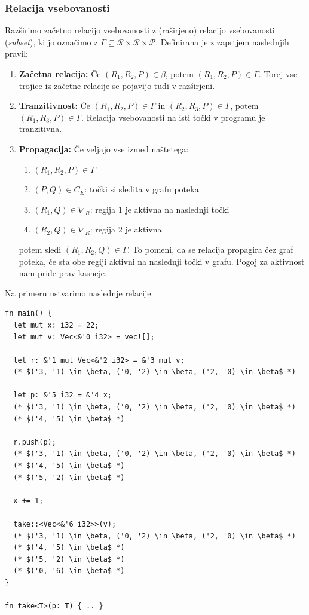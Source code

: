 \documentclass{article}
\begin{document}
\subsubsection{Relacija vsebovanosti}

Razširimo začetno relacijo vsebovanosti z (raširjeno) relacijo vsebovanosti (\textit{subset}), ki jo označimo z
$\Gamma \subseteq \mathcal{R} \times \mathcal{R} \times \mathcal{P}$. Definirana je z zaprtjem naslednjih pravil:

\begin{enumerate}
	\item \textbf{Začetna relacija: }Če $(R_1, R_2, P) \in \beta$, potem $(R_1, R_2, P) \in \Gamma$. Torej vse trojice
	      iz začetne relacije se pojavijo tudi v razširjeni.
	\item \textbf{Tranzitivnost:} Če $(R_1, R_2, P) \in \Gamma$ in $(R_2, R_3, P) \in \Gamma$, potem $(R_1, R_3, P) \in \Gamma$.
	      Relacija vsebovanosti na isti točki v programu je tranzitivna.
	\item \textbf{Propagacija:} Če veljajo vse izmed naštetega:
	      \begin{enumerate}
		      \item $(R_1, R_2, P) \in \Gamma$
		      \item $(P, Q) \in C_E$: točki si sledita v grafu poteka
		      \item $(R_1, Q) \in \nabla_R$: regija 1 je aktivna na naslednji točki
		      \item $(R_2, Q) \in \nabla_R$: regija 2 je aktivna
	      \end{enumerate}
	      potem sledi $(R_1, R_2, Q) \in \Gamma$. To pomeni, da se relacija propagira čez graf poteka, če sta obe
	      regiji aktivni na naslednji točki v grafu. Pogoj za aktivnost nam pride prav kasneje.
\end{enumerate}

Na primeru ustvarimo naslednje relacije:

\begin{lstlisting}
fn main() {
  let mut x: i32 = 22;
  let mut v: Vec<&'0 i32> = vec![];

  let r: &'1 mut Vec<&'2 i32> = &'3 mut v;
  (* $('3, '1) \in \beta, ('0, '2) \in \beta, ('2, '0) \in \beta$ *)

  let p: &'5 i32 = &'4 x;
  (* $('3, '1) \in \beta, ('0, '2) \in \beta, ('2, '0) \in \beta$ *)
  (* $('4, '5) \in \beta$ *)

  r.push(p);
  (* $('3, '1) \in \beta, ('0, '2) \in \beta, ('2, '0) \in \beta$ *)
  (* $('4, '5) \in \beta$ *)
  (* $('5, '2) \in \beta$ *)
  
  x += 1;

  take::<Vec<&'6 i32>>(v);
  (* $('3, '1) \in \beta, ('0, '2) \in \beta, ('2, '0) \in \beta$ *)
  (* $('4, '5) \in \beta$ *)
  (* $('5, '2) \in \beta$ *)
  (* $('0, '6) \in \beta$ *)
}

fn take<T>(p: T) { .. }
\end{lstlisting}
\end{document}
